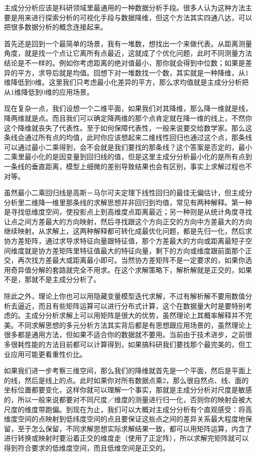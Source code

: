 \documentclass[]{tufte-book}
\begin{document}
主成分分析应该是科研领域里最通用的一种数据分析手段。很多人认为这种方法主要是用来进行探索分析的可视化手段与数据降维，但这个方法其实四通八达，可以把很多数据分析的概念连接起来。

首先还是回到一个最简单的场景，我有一堆数，想找出一个来做代表。从距离测量角度，就是找一个点让它离所有点最近，这就成了个优化问题，此时不同测量方法结论是不一样的。例如你考虑距离的绝对值最小，那你就会得到中位数；如果是差异的平方，求导后就是均值。回想下对一堆数找一个数，其实就是一种降维，从1维降低到0维。这里我们只考虑最小化差异的平方，那么求均值就是主成分分析把从1维降低到0维的应用场景。

现在复杂一点，我们设想一个二维平面，如果我们对其降维，那么降一维就是线，降两维就是点。而且我们可以确定降两维的那个点肯定就在降一维的线上，不然你这个降维就丧失了代表性。至于如何保障代表性，一般来说要交给数学家。那么这条线会通过所有点的均值，此时你应该想起来二维线性回归也通过这个点，那条线可以通过最小二乘得到，会不会就是我们要找的那条线？这个答案是否定的，最小二乘里最小化的是因变量到回归线的值，但是这里主成分分析最小化的是所有点到一条线的垂直距离，模型上细微的差别导致结果也会有区别，事实上求解过程也不对等。

虽然最小二乘回归线是高斯－马尔可夫定理下线性回归的最佳无偏估计，但主成分分析里二维降一维里那条线的求解思想并非回归到均值，常见有两种解释。第一种是寻找低维度空间，使投影点上到高维度点距离最近；另一种则是从统计角度寻找让点之间方差最大的方向映射，然后寻找跟这个方向正交的方向中方差最大的方向继续映射。从求解上，这两种解释都可转化成最优化问题，都是先归一化，然后求协方差矩阵，通过求导求特征向量跟特征值，那个方差最大的方向或距离最短子空间维度就是协方差矩阵里特征值最大的特征向量，剩下的方向或维度跟前面那个正交，再次找方差最大或距离最小即可。当然协方差矩阵不是一定要求的，如果你选用奇异值分解的套路就完全不用求。在这个求解策略下，解析解就是正交的，如果不是，那就不是主成分分析了。

除此之外，理论上你也可以用隐藏变量模型迭代求解，不过有解析解不要用数值分析去逼近，而且有些矩阵运算可以进行分布式计算，这个在数据量大时是要特别考虑的。主成分分析求解上可以用矩阵是很大的优势，虽然理论上其概率解释并不完美。不同求解思想的多元分析方法其实背后都是有思想跟应用场景的，虽然理论上很多都是通用方法，但如果不适合你的数据就不要用。当前由于技术进步，之前很多很耗性能的方法目前都可以计算得到，如果搞科研我们要找那个最完美的，但工业应用可能更看重性价比。

如果我们进一步考察三维空间，那么我们的降维就首先是一个平面，然后是平面上的线，然后是线上的点。此时如果你对所有数据点乘2，那么很自然点、线、面的坐标位置都要变化，这样你就可以理解一个事实，那就是主成分分析对尺度是敏感的，所以一般来说都要对不同尺度／维度的测量进行归一化，否则你的映射会被大尺度的维度带跑偏。到现在为止，我们可以大概对主成分分析有个直观感受：将高维度空间的点映射到低纬度空间的点且要保证这些点之间的差异关系最大程度地保留，至于怎么保留，不同求解思想实际求解结果一致，都可以用矩阵运算，内含了进行转换或映射时要沿着正交的维度走（使用了正定阵），所以求解完矩阵就可以得到符合要求的低维度空间，而且低维空间是正交的。
\end{document}
